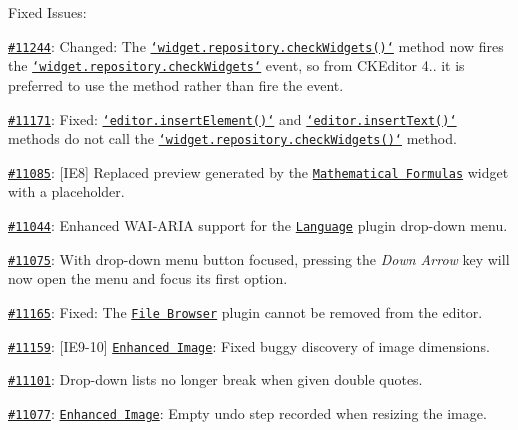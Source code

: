 Fixed Issues\-:
\begin{DoxyItemize}
\item \href{http://dev.ckeditor.com/ticket/11244}{\tt \#11244}\-: Changed\-: The \href{http://docs.ckeditor.com/#!/api/CKEDITOR.plugins.widget.repository-method-checkWidgets}{\tt `widget.repository.\-check\-Widgets()`} method now fires the \href{http://docs.ckeditor.com/#!/api/CKEDITOR.plugins.widget.repository-event-checkWidgets}{\tt `widget.repository.\-check\-Widgets`} event, so from C\-K\-Editor 4.. it is preferred to use the method rather than fire the event.
\item \href{http://dev.ckeditor.com/ticket/11171}{\tt \#11171}\-: Fixed\-: \href{http://docs.ckeditor.com/#!/api/CKEDITOR.editor-method-insertElement}{\tt `editor.insert\-Element()`} and \href{http://docs.ckeditor.com/#!/api/CKEDITOR.editor-method-insertText}{\tt `editor.insert\-Text()`} methods do not call the \href{http://docs.ckeditor.com/#!/api/CKEDITOR.plugins.widget.repository-method-checkWidgets}{\tt `widget.repository.\-check\-Widgets()`} method.
\item \href{http://dev.ckeditor.com/ticket/11085}{\tt \#11085}\-: \mbox{[}I\-E8\mbox{]} Replaced preview generated by the \href{http://ckeditor.com/addon/mathjax}{\tt Mathematical Formulas} widget with a placeholder.
\item \href{http://dev.ckeditor.com/ticket/11044}{\tt \#11044}\-: Enhanced W\-A\-I-\/\-A\-R\-I\-A support for the \href{http://ckeditor.com/addon/language}{\tt Language} plugin drop-\/down menu.
\item \href{http://dev.ckeditor.com/ticket/11075}{\tt \#11075}\-: With drop-\/down menu button focused, pressing the {\itshape Down Arrow} key will now open the menu and focus its first option.
\item \href{http://dev.ckeditor.com/ticket/11165}{\tt \#11165}\-: Fixed\-: The \href{http://ckeditor.com/addon/filebrowser}{\tt File Browser} plugin cannot be removed from the editor.
\item \href{http://dev.ckeditor.com/ticket/11159}{\tt \#11159}\-: \mbox{[}I\-E9-\/10\mbox{]} \href{http://ckeditor.com/addon/image2}{\tt Enhanced Image}\-: Fixed buggy discovery of image dimensions.
\item \href{http://dev.ckeditor.com/ticket/11101}{\tt \#11101}\-: Drop-\/down lists no longer break when given double quotes.
\item \href{http://dev.ckeditor.com/ticket/11077}{\tt \#11077}\-: \href{http://ckeditor.com/addon/image2}{\tt Enhanced Image}\-: Empty undo step recorded when resizing the image.

\end{DoxyItemize}

